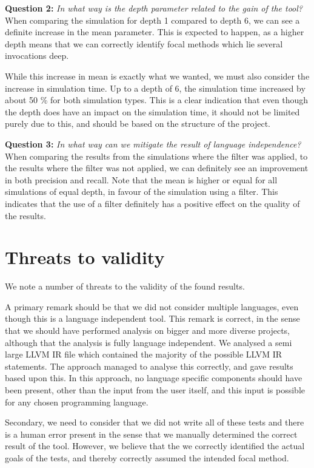 \documentclass[11pt]{article}
\begin{document}
\begin{multicols}{2}
\noindent
\textbf{Question 2:} \textit{In what way is the depth parameter related to the gain of the tool?}\\
When comparing the simulation for depth 1 compared to depth 6, we can see a definite increase in the mean parameter. This is expected to happen, as a higher depth means that we can correctly identify focal methods which lie several invocations deep. 

While this increase in mean is exactly what we wanted, we must also consider the increase in simulation time. Up to a depth of 6, the simulation time increased by about 50 \% for both simulation types. This is a clear indication that even though the depth does have an impact on the simulation time, it should not be limited purely due to this, and should be based on the structure of the project.

\noindent
\textbf{Question 3:} \textit{In what way can we mitigate the result of language independence?}\\
When comparing the results from the simulations where the filter was applied, to the results where the filter was not applied, we can definitely see an improvement in both precision and recall. Note that the mean is higher or equal for all simulations of equal depth, in favour of the simulation using a filter. This indicates that the use of a filter definitely has a positive effect on the quality of the results.

\section{Threats to validity}
We note a number of threats to the validity of the found results.

A primary remark should be that we did not consider multiple languages, even though this is a language independent tool. This remark is correct, in the sense that we should have performed analysis on bigger and more diverse projects, although that the analysis is fully language independent. We analysed a semi large LLVM IR file which contained the majority of the possible LLVM IR statements. The approach managed to analyse this correctly, and gave results based upon this. In this approach, no language specific components should have been present, other than the input from the user itself, and this input is possible for any chosen programming language. 

Secondary, we need to consider that we did not write all of these tests and there is a human error present in the sense that we manually determined the correct result of the tool. However, we believe that the we correctly identified the actual goals of the tests, and thereby correctly assumed the intended focal method.


\end{multicols}
\end{document}
